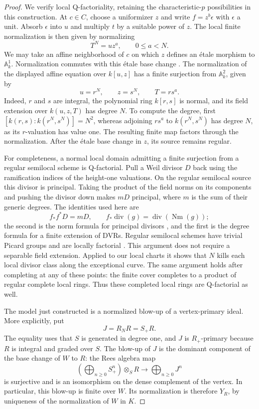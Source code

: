 \begin{proof}
We verify local Q-factoriality, retaining the characteristic-$p$
possibilities in this construction.  At $c\in C$, choose a
uniformizer $z$ and write $f=z^b\epsilon$ with $\epsilon$ a unit.
Absorb $\epsilon$ into $u$ and multiply $t$ by a suitable power of
$z$.  The local finite normalization is then given by normalizing
\begin{equation}\label{D:weighted-toric-chart}
 T^N=u z^a,\qquad 0\leq a<N.
\end{equation}
We may take an affine neighborhood of $c$ on which $z$ defines an
\'etale morphism to $\mathbb A^1_k$.  Normalization commutes with
this \'etale base change
\cite[Lemma 37.19.2, tag 03GV]{C_StacksWeightedCone}.
The normalization of the displayed affine equation over
$k[u,z]$ has a finite surjection from $\mathbb A^2_k$, given by
\[
 u=r^N,\qquad z=s^N,\qquad T=r s^a.
\]
Indeed, $r$ and $s$ are integral, the polynomial ring $k[r,s]$
is normal, and its field extension over $k(u,z,T)$ has degree
$N$.  To compute the degree, first
$[k(r,s):k(r^N,s^N)]=N^2$, whereas adjoining $r s^a$ to
$k(r^N,s^N)$ has degree $N$, as its $r$-valuation has value one.
The resulting finite map factors through the normalization.
After the \'etale base change in $z$, its source remains regular.

For completeness, a normal local domain admitting a finite
surjection from a regular semilocal scheme is Q-factorial.  Pull
a Weil divisor $D$ back using the ramification indices of the
height-one valuations.  On the regular semilocal source this
divisor is principal.  Taking the product of the field norms on
its components and pushing the divisor down makes $mD$ principal,
where $m$ is the sum of their generic degrees.  The identities
used here are
\[
 f_*f^*D=mD,\qquad
 f_*\operatorname{div}(g)=\operatorname{div}(\operatorname{Nm}(g));
\]
the second is the norm formula for principal divisors
\cite[Lemma 42.18.1, tag 02RS]{C_StacksWeightedCone}, and the first
is the degree formula for a finite extension of DVRs.  Regular
semilocal schemes have trivial Picard groups and are locally
factorial \cite[tags 02M9 and 0AG0]{C_StacksWeightedCone}.
This argument does not require a separable field
extension.  Applied to our local charts it shows that $N$ kills
each local divisor class along the exceptional curve.  The same
argument holds after completing at any of these points: the
finite cover completes to a product of regular complete local
rings.  Thus these completed local rings are Q-factorial as well.

The model just constructed is a normalized blow-up of a
vertex-primary ideal.  More explicitly, put
\[
 J=R_N R=S_+R.
\]
The equality uses that $S$ is generated in degree one, and $J$
is $R_+$-primary because $R$ is integral and graded over $S$.
The blow-up of $J$ is the dominant component of the base change
of $W$ to $R$: the Rees algebra map
\[
 \left(\bigoplus_{n\geq0}S_+^n\right)\otimes_S R
 \longrightarrow \bigoplus_{n\geq0}J^n
\]
is surjective and is an isomorphism on the dense complement of
the vertex.  In particular, this blow-up is finite over $W$.
Its normalization is therefore $Y_R$, by uniqueness of the
normalization of $W$ in $K$.


\end{proof}
